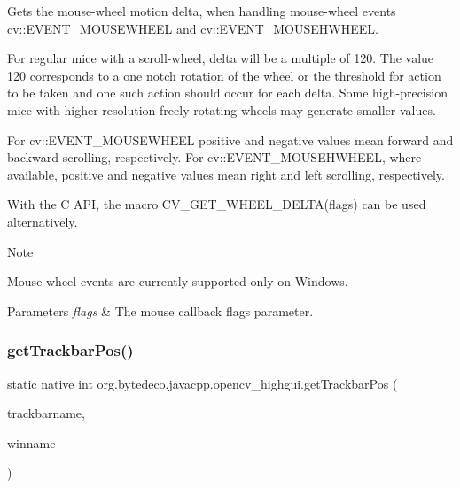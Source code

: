Gets the mouse-\/wheel motion delta, when handling mouse-\/wheel events cv\+::\+E\+V\+E\+N\+T\+\_\+\+M\+O\+U\+S\+E\+W\+H\+E\+EL and cv\+::\+E\+V\+E\+N\+T\+\_\+\+M\+O\+U\+S\+E\+H\+W\+H\+E\+EL. 

For regular mice with a scroll-\/wheel, delta will be a multiple of 120. The value 120 corresponds to a one notch rotation of the wheel or the threshold for action to be taken and one such action should occur for each delta. Some high-\/precision mice with higher-\/resolution freely-\/rotating wheels may generate smaller values. 

For cv\+::\+E\+V\+E\+N\+T\+\_\+\+M\+O\+U\+S\+E\+W\+H\+E\+EL positive and negative values mean forward and backward scrolling, respectively. For cv\+::\+E\+V\+E\+N\+T\+\_\+\+M\+O\+U\+S\+E\+H\+W\+H\+E\+EL, where available, positive and negative values mean right and left scrolling, respectively. 

With the C A\+PI, the macro C\+V\+\_\+\+G\+E\+T\+\_\+\+W\+H\+E\+E\+L\+\_\+\+D\+E\+L\+T\+A(flags) can be used alternatively. 

\begin{DoxyNote}{Note}

\end{DoxyNote}
Mouse-\/wheel events are currently supported only on Windows. 


\begin{DoxyParams}{Parameters}
{\em flags} & The mouse callback flags parameter. \\
\hline
\end{DoxyParams}
\mbox{\label{group__highgui_gad91f649b98c33cbfdbf3c995935facdc}} 
\subsubsection{\texorpdfstring{get\+Trackbar\+Pos()}{getTrackbarPos()}}
{\footnotesize\ttfamily static native int org.\+bytedeco.\+javacpp.\+opencv\+\_\+highgui.\+get\+Trackbar\+Pos (\begin{DoxyParamCaption}\item[{@Str Byte\+Pointer}]{trackbarname,  }\item[{@Str Byte\+Pointer}]{winname }\end{DoxyParamCaption})\hspace{0.3cm}{\ttfamily [static]}}



